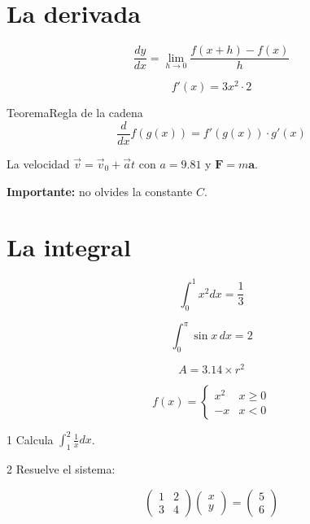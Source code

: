 \documentclass[11pt]{article}
\title{#1}\author{#2}\date{}%
\begin{document}

\section*{La derivada}

\[
\frac{dy}{dx}= \lim_{h \to 0}\frac{f(x + h) - f(x)}{h}
\]


\[
f'(x) = 3x^{2} \cdot 2
\]

\begin{cltheorem}{Teorema}{Regla de la cadena}
\[
\frac{d}{dx}f(g(x)) = f'(g(x)) \cdot g'(x)
\]
\end{cltheorem}

La velocidad \(\vec{v}= \vec{v}_{0} + \vec{a}t\) con \(a = 9.81\) y \(\mathbf{F}= m \mathbf{a}\).

\textcolor{clRed}{\textbf{Importante: }}no olvides la constante \textcolor{clBlue}{\(C\)}.

\section*{La integral}

\[
\int_{0}^{1} x^{2} dx = \frac{1}{3}
\]

\[
\int_{0}^{\pi}\sin x \, dx = 2
\]

\[
A = 3.14 \times r^{2}
\]

\[
f(x) = \begin{cases}x^{2}&x \geq 0 \\ -x&x < 0\end{cases}
\]

\begin{clproblem}{1}{}
Calcula \(\int_{1}^{2} \frac{1}{x}dx\).

\end{clproblem}

\begin{clproblem}{2}{}
Resuelve el sistema:

\[
\begin{pmatrix}1 & 2 \\ 3 & 4\end{pmatrix} \begin{pmatrix}x \\ y\end{pmatrix} = \begin{pmatrix}5 \\ 6\end{pmatrix}
\]
\end{clproblem}
\end{document}
